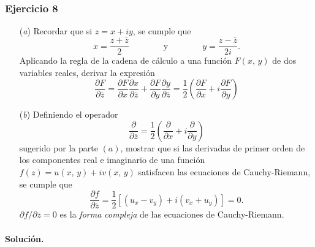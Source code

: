 \documentclass[a4paper]{report}
\begin{document}
\subsubsection{Ejercicio 8}

\begin{enumerate}
 \item[(\textit{a})] Recordar que si \(z=x+iy\), se cumple que 
 \[
  x=\frac{z+\overline{z}}{2}
  \qquad\qquad\textrm{y}\qquad\qquad
  y=\frac{z-\overline{z}}{2i}.
 \]
 Aplicando la regla de la cadena de cálculo a una función \(F(x,\,y)\) de dos variables reales, derivar la expresión
 \[
  \frac{\partial F}{\partial\overline{z}}=
  \frac{\partial F}{\partial x}\frac{\partial x}{\partial\overline{z}}+\frac{\partial F}{\partial y}\frac{\partial y}{\partial\overline{z}}=
  \frac{1}{2}\left(\frac{\partial F}{\partial x}+i\frac{\partial F}{\partial y}\right)
 \]
 \item[(\textit{b})] Definiendo el operador
 \[
  \frac{\partial}{\partial\overline{z}}=
  \frac{1}{2}\left(\frac{\partial}{\partial x}+i\frac{\partial}{\partial y}\right)
 \]
 sugerido por la parte \((a)\), mostrar que si las derivadas de primer orden de los componentes real e imaginario de una función \(f(z)=u(x,\,y)+iv(x,\,y)\) satisfacen las ecuaciones de Cauchy-Riemann, se cumple que 
 \[
  \frac{\partial f}{\partial\overline{z}}=\frac{1}{2}[(u_x-v_y)+i(v_x+u_y)]=0.
 \]
 \(\partial f/\partial\overline{z}=0\) es la \emph{forma compleja} de las ecuaciones de Cauchy-Riemann.
\end{enumerate}

\paragraph{Solución.}
\end{document}
